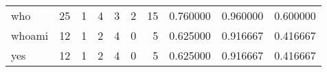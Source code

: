 \begin{longtable}{lrrrrrrrrr}
who       &                                      25 &                                                  1 &                                                  4 &                                                  3 &                                                  2 &                                                 15 &                                           0.760000 &                               0.960000 &                             0.600000 \\
whoami    &                                      12 &                                                  1 &                                                  2 &                                                  4 &                                                  0 &                                                  5 &                                           0.625000 &                               0.916667 &                             0.416667 \\
yes       &                                      12 &                                                  1 &                                                  2 &                                                  4 &                                                  0 &                                                  5 &                                           0.625000 &                               0.916667 &                             0.416667 \\
\end{longtable}
